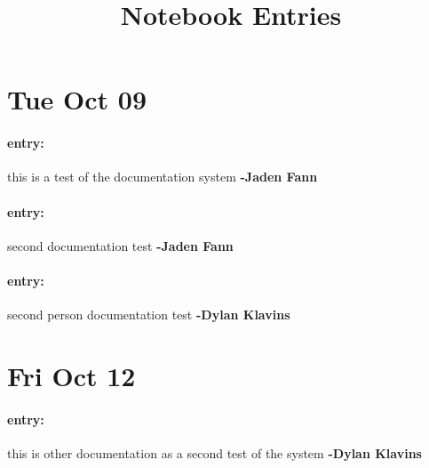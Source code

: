 \documentclass{article}
\title{Notebook Entries}
\begin{document}
\maketitle

\section{Tue Oct 09}
\paragraph{entry:} 	this is a test
	of the documentation system \textbf{-Jaden Fann}
\paragraph{entry:} 	second documentation test \textbf{-Jaden Fann}
\paragraph{entry:} 	second person documentation test \textbf{-Dylan Klavins}
\section{Fri Oct 12}
\paragraph{entry:} 	this is other documentation
	as a second test of the system \textbf{-Dylan Klavins}
\end{document}
